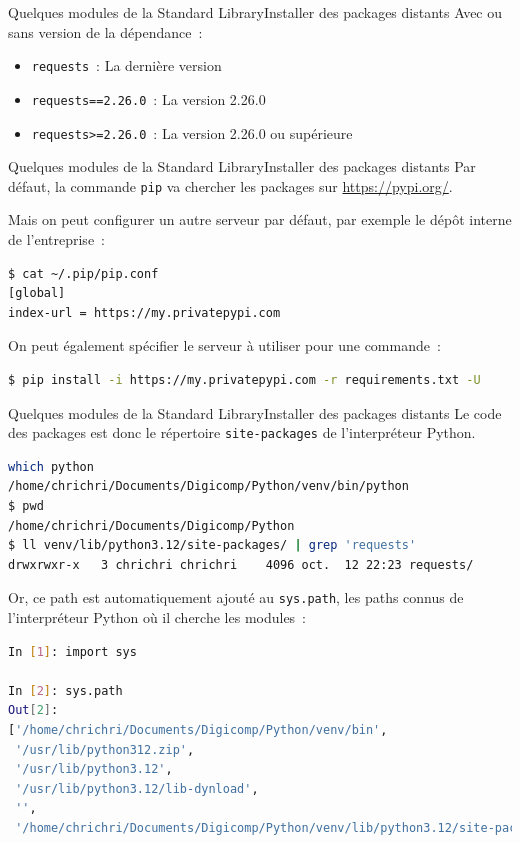 \documentclass{beamer}
\begin{document}
    \begin{frame}[fragile]{Quelques modules de la Standard Library}{Installer des packages distants}
        Avec ou sans version de la dépendance~:
        \begin{itemize}
            \item \lstinline{requests}~: La dernière version
            \item \lstinline{requests==2.26.0}~: La version 2.26.0
            \item \lstinline{requests>=2.26.0}~: La version 2.26.0 ou supérieure
        \end{itemize}
    \end{frame}

    \begin{frame}[fragile]{Quelques modules de la Standard Library}{Installer des packages distants}
        Par défaut, la commande \lstinline{pip} va chercher les packages sur \url{https://pypi.org/}.

        Mais on peut configurer un autre serveur par défaut, par exemple le dépôt interne de l'entreprise~:
        \begin{lstlisting}[language=Bash]
$ cat ~/.pip/pip.conf
[global]
index-url = https://my.privatepypi.com
        \end{lstlisting}
        \bigbreak
        On peut également spécifier le serveur à utiliser pour une commande~:
        \begin{lstlisting}[language=Bash]
$ pip install -i https://my.privatepypi.com -r requirements.txt -U
        \end{lstlisting}
    \end{frame}

    \begin{frame}[fragile]{Quelques modules de la Standard Library}{Installer des packages distants}
        Le code des packages est donc le répertoire \lstinline{site-packages} de l'interpréteur Python.
        \begin{lstlisting}[language=Bash]
which python
/home/chrichri/Documents/Digicomp/Python/venv/bin/python
$ pwd
/home/chrichri/Documents/Digicomp/Python
$ ll venv/lib/python3.12/site-packages/ | grep 'requests'
drwxrwxr-x   3 chrichri chrichri    4096 oct.  12 22:23 requests/
        \end{lstlisting}
        Or, ce path est automatiquement ajouté au \lstinline{sys.path}, les paths connus de l'interpréteur Python où il cherche les modules~:
        \begin{lstlisting}[language=Bash]
In [1]: import sys

In [2]: sys.path
Out[2]:
['/home/chrichri/Documents/Digicomp/Python/venv/bin',
 '/usr/lib/python312.zip',
 '/usr/lib/python3.12',
 '/usr/lib/python3.12/lib-dynload',
 '',
 '/home/chrichri/Documents/Digicomp/Python/venv/lib/python3.12/site-packages']
        \end{lstlisting}
    \end{frame}
\end{document}
